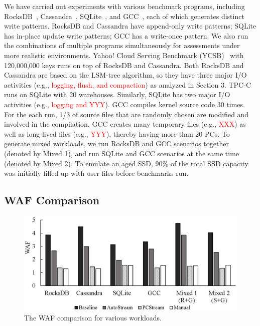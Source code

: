 We have carried out experiments with various benchmark programs, including
RocksDB~\cite{}, Cassandra~\cite{}, SQLite~\cite{}, and GCC~\cite{}, each of
which generates distinct write patterns.  RocksDB and Cassandra have
append-only write patterns; SQLite has in-place update write patterns; GCC has
a write-once pattern.  We also run the combinations of multiple programs
simultaneously for assessments under more realistic environments.  Yahoo! Cloud
Serving Benchmark (YCSB)~\cite{YCSB} with 120,000,000 keys runs on top of
RocksDB and Cassandra.  Both RocksDB and Cassandra are based on the LSM-tree
algorithm, so they have three major I/O activities (e.g.,
\textcolor{red}{logging, flush, and compaction}) as analyzed in Section 3.
TPC-C~\cite{TPCC} runs on SQLite with 20 warehouses.  Similarly, SQLite has two
major I/O activities (e.g., \textcolor{red}{logging and YYY}). 
GCC compiles kernel source code 30 times. For the each run, 1/3 of source files
that are randomly chosen are modified and involved in the compilation.  GCC
creates many temporary files (e.g., \textcolor{red}{XXX}) as well as long-lived
files (e.g., \textcolor{red}{YYY}), thereby having more than 20 PCs.  To
generate mixed workloads, we run RocksDB and GCC scenarios together (denoted by
Mixed 1), and run SQLite and GCC scenarios at the same time (denoted by Mixed
2).
To emulate an aged SSD, 90\% of the total SSD capacity was initially filled up
with user files before benchmarks run.


\subsection{WAF Comparison}

\begin{figure}[t]
	\centering
	\includegraphics[width=0.9\linewidth]{figure/waf}
	\caption{The WAF comparison for various workloads.}
	\label{fig:waf}
\end{figure}

